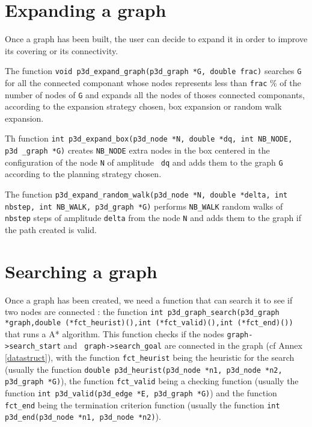 \section{Expanding a graph}

Once a graph has been built, the user can decide to expand it in order
to improve its covering or its connectivity. 

The function {\tt void p3d\_expand\_graph(p3d\_graph *G, double frac)}
searches {\tt G} for all the connected componant whose nodes represents less
than {\tt frac} \% of the number of nodes of {\tt G} and expands all
the nodes of thoses connected componants, according to the expansion
strategy chosen, box expansion or random walk expansion. 

Th function {\tt int p3d\_expand\_box(p3d\_node *N, double *dq, int
NB\_NODE, p3d \_graph *G)}  creates {\tt NB\_NODE} extra nodes in the box
centered in the configuration of the node {\tt N} of amplitude {\tt
dq} and adds them to the graph {\tt G} according to the planning strategy
chosen. 

The function {\tt p3d\_expand\_random\_walk(p3d\_node *N, double
*delta, int nbstep, int NB\_WALK, p3d\_graph *G)}
 performs {\tt NB\_WALK}
random walks of {\tt nbstep} steps of amplitude {\tt delta} from the
node {\tt N} and adds them to the graph if the path created is valid.

\section{Searching a graph}

Once a graph has been created, we need a function that can search it
to see if two nodes are connected : the function {\tt int
p3d\_graph\_search(p3d\_graph *graph,double (*fct\_heurist)(),int
(*fct\_valid)(),int (*fct\_end)())}  that runs a A* algorithm. This
function checks if the nodes {\tt graph->search\_start} and {\tt
graph->search\_goal} are connected in the graph (cf Annex
\ref{datastruct}), with the function {\tt fct\_heurist} being the
heuristic for the search (usually the function {\tt double
p3d\_heurist(p3d\_node *n1, p3d\_node *n2, p3d\_graph *G)}), the
function {\tt fct\_valid} being a checking function (usually the
function {\tt int p3d\_valid(p3d\_edge *E, p3d\_graph *G)}) and the
function {\tt fct\_end} being the termination criterion function
(usually the function {\tt int p3d\_end(p3d\_node *n1, p3d\_node
*n2)}).

